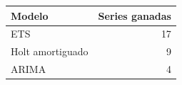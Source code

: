 
\begin{tabular}{lr}
\toprule
Modelo & Series ganadas\\
\midrule
ETS & 17\\
Holt amortiguado & 9\\
ARIMA & 4\\
\bottomrule
\end{tabular}